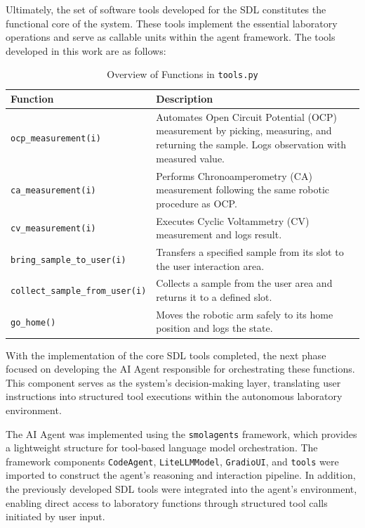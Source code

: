 Ultimately, the set of software tools developed for the SDL constitutes the functional core of the system. These tools implement the essential laboratory operations and serve as callable units within the agent framework. The tools developed in this work are as follows:

\begin{table}[h!]
\centering
\caption{Overview of Functions in \texttt{tools.py}}
\begin{tabular}{|l|p{10cm}|}
\hline
\textbf{Function} & \textbf{Description} \\ \hline
\texttt{ocp\_measurement(i)} & Automates Open Circuit Potential (OCP) measurement by picking, measuring, and returning the sample. Logs observation with measured value. \\ \hline
\texttt{ca\_measurement(i)} & Performs Chronoamperometry (CA) measurement following the same robotic procedure as OCP. \\ \hline
\texttt{cv\_measurement(i)} & Executes Cyclic Voltammetry (CV) measurement and logs result. \\ \hline
\texttt{bring\_sample\_to\_user(i)} & Transfers a specified sample from its slot to the user interaction area. \\ \hline
\texttt{collect\_sample\_from\_user(i)} & Collects a sample from the user area and returns it to a defined slot. \\ \hline
\texttt{go\_home()} & Moves the robotic arm safely to its home position and logs the state. \\ \hline
\end{tabular}
\end{table}

With the implementation of the core SDL tools completed, the next phase focused on developing the AI Agent responsible for orchestrating these functions. This component serves as the system’s decision-making layer, translating user instructions into structured tool executions within the autonomous laboratory environment.

The AI Agent was implemented using the \texttt{smolagents} framework, which provides a lightweight structure for tool-based language model orchestration. The framework components \texttt{CodeAgent}, \texttt{LiteLLMModel}, \texttt{GradioUI}, and \texttt{tools} were imported to construct the agent's reasoning and interaction pipeline. In addition, the previously developed SDL tools were integrated into the agent's environment, enabling direct access to laboratory functions through structured tool calls initiated by user input.

